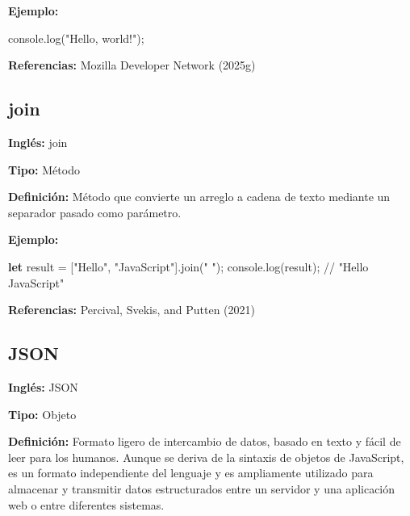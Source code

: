 \documentclass[
  letterpaper,
  DIV=11,
  numbers=noendperiod]{scrreprt}
\newenvironment{Shaded}{\begin{snugshade}}{\end{snugshade}}
\newcommand{\BuiltInTok}[1]{\textcolor[rgb]{0.00,0.23,0.31}{#1}}
\newcommand{\CommentTok}[1]{\textcolor[rgb]{0.37,0.37,0.37}{#1}}
\newcommand{\FunctionTok}[1]{\textcolor[rgb]{0.28,0.35,0.67}{#1}}
\newcommand{\KeywordTok}[1]{\textcolor[rgb]{0.00,0.23,0.31}{\textbf{#1}}}
\newcommand{\NormalTok}[1]{\textcolor[rgb]{0.00,0.23,0.31}{#1}}
\newcommand{\OperatorTok}[1]{\textcolor[rgb]{0.37,0.37,0.37}{#1}}
\newcommand{\StringTok}[1]{\textcolor[rgb]{0.13,0.47,0.30}{#1}}
\let\oldsubsection\subsection
\renewcommand{\subsection}{\phantomsection\oldsubsection}
\begin{document}
\textbf{Ejemplo:}

\begin{Shaded}
\begin{Highlighting}[]
\BuiltInTok{console}\OperatorTok{.}\FunctionTok{log}\NormalTok{(}\StringTok{"Hello, world!"}\NormalTok{)}\OperatorTok{;}
\end{Highlighting}
\end{Shaded}

\textbf{Referencias:} Mozilla Developer Network (2025g)

\subsection*{join}\label{glos-join}

\textbf{Inglés:} join

\textbf{Tipo:} Método

\textbf{Definición:} Método que convierte un arreglo a cadena de texto
mediante un separador pasado como parámetro.

\textbf{Ejemplo:}

\begin{Shaded}
\begin{Highlighting}[]
\KeywordTok{let}\NormalTok{ result }\OperatorTok{=}\NormalTok{ [}\StringTok{"Hello"}\OperatorTok{,} \StringTok{"JavaScript"}\NormalTok{]}\OperatorTok{.}\FunctionTok{join}\NormalTok{(}\StringTok{" "}\NormalTok{)}\OperatorTok{;}
\BuiltInTok{console}\OperatorTok{.}\FunctionTok{log}\NormalTok{(result)}\OperatorTok{;} \CommentTok{// "Hello JavaScript"}
\end{Highlighting}
\end{Shaded}

\textbf{Referencias:} Percival, Svekis, and Putten (2021)

\subsection*{JSON}\label{glos-json}

\textbf{Inglés:} JSON

\textbf{Tipo:} Objeto

\textbf{Definición:} Formato ligero de intercambio de datos, basado en
texto y fácil de leer para los humanos. Aunque se deriva de la sintaxis
de objetos de JavaScript, es un formato independiente del lenguaje y es
ampliamente utilizado para almacenar y transmitir datos estructurados
entre un servidor y una aplicación web o entre diferentes sistemas.
\end{document}

